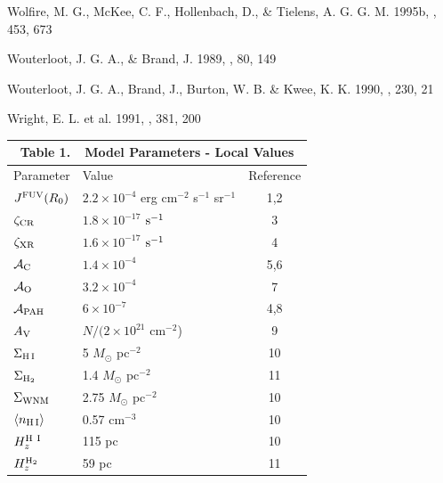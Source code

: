 \documentclass[12pt,preprint,flushrt]{aastex}
\begin{document}
\begin{thebibliography}{}
Wolfire, M. G., McKee, C. F., Hollenbach, D., \& Tielens,
A. G. G. M. 1995b, \apj, 453, 673

Wouterloot, J. G. A., \&
Brand, J. 1989, \aaps, 80, 149

Wouterloot, J. G. A., Brand, J.,
Burton, W. B. \& Kwee, K. K. 1990, \aap, 230, 21

Wright, E. L. et al. 1991, \apj,
381, 200
\end{thebibliography}

\clearpage
{\small
{}
\begin{tabular}{llc}
\multicolumn{3}{c}{Table 1.\ \ Model Parameters 
              - Local Values\tablenotemark{a}\label{tbl:modelparam1}}\\ \hline\hline
 {Parameter} & {Value} &{Reference} \\ \hline
$J^{\rm FUV}(R_0)$\tablenotemark{b} & $2.2\times 10^{-4}$  erg cm$^{-2}$ 
   s$^{-1}$ sr$^{-1}$ & 1,2\\
$\zeta_{\rm CR}$\tablenotemark{c} & $1.8\times 10^{-17}$ ${\rm s^{-1}}$ & 3\\
$\zeta_{\rm XR}$\tablenotemark{d} & $1.6\times 10^{-17}$ ${\rm s^{-1}}$ & 4\\
$\cal{A}_{\rm C}$\tablenotemark{e} & $1.4\times 10^{-4}$ & 5,6\\
$\cal{A}_{\rm O}$\tablenotemark{f} & $3.2\times 10^{-4}$ & 7\\
$\cal{A}_{\rm PAH}$\tablenotemark{g} & $6\times 10^{-7}$ & 4,8\\
$A_{\rm V}$\tablenotemark{h} &$N/(2\times 10^{21}$ cm$^{-2}$) & 9\\
$\Sigma_{\rm H\, I}$\tablenotemark{i}  & 5 $M_{\odot}$ pc$^{-2}$ & 10\\
$\Sigma_{\rm H_2}$\tablenotemark{j}  & 1.4 $M_{\odot}$ pc$^{-2}$& 11\\
$\Sigma_{\rm WNM}$\tablenotemark{k}  & 2.75 $M_{\odot}$ pc$^{-2}$ & 10\\
$\langle n_{\rm H\, I} \rangle$\tablenotemark{l} &  0.57 cm$^{-3}$ & 10\\
$H_z^{\rm H~I}$\tablenotemark{m} & 115 pc & 10\\
$H_z^{\rm H_2}$\tablenotemark{n} & 59 pc & 11\\ \hline
\end{tabular}

}
\end{document}
